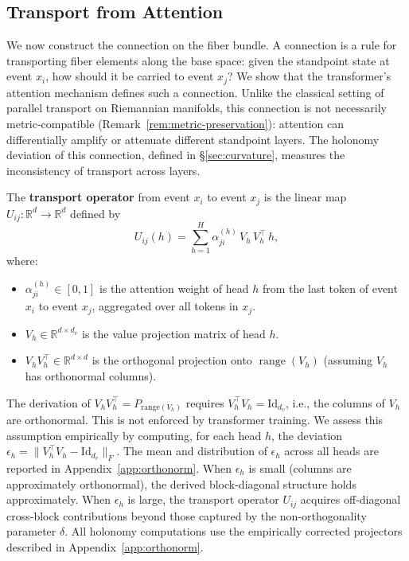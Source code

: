 \subsection{Transport from Attention}
\label{sec:transport}

We now construct the connection on the fiber bundle. A connection is a rule for
transporting fiber elements along the base space: given the standpoint state at event
$x_i$, how should it be carried to event $x_j$? We show that the transformer's attention
mechanism defines such a connection. Unlike the classical setting of parallel transport on
Riemannian manifolds, this connection is not necessarily metric-compatible
(Remark~\ref{rem:metric-preservation}): attention can differentially amplify or attenuate
different standpoint layers. The holonomy deviation of this connection, defined in
\S\ref{sec:curvature}, measures the inconsistency of transport across layers.

\begin{definition}
\label{def:transport-operator}
The \textbf{transport operator} from event $x_i$ to event $x_j$ is the linear map
$U_{ij} : \mathbb{R}^d \to \mathbb{R}^d$ defined by
\[
    U_{ij}(h) = \sum_{h=1}^{H} \alpha_{ji}^{(h)}\, V_h\, V_h^\top\, h,
\]
where:
\begin{itemize}
    \item $\alpha_{ji}^{(h)} \in [0,1]$ is the attention weight of head $h$ from the
    last token of event $x_i$ to event $x_j$, aggregated over all tokens in $x_j$.
    \item $V_h \in \mathbb{R}^{d \times d_v}$ is the value projection matrix of head $h$.
    \item $V_h V_h^\top \in \mathbb{R}^{d \times d}$ is the orthogonal projection onto
    $\operatorname{range}(V_h)$ (assuming $V_h$ has orthonormal columns).
\end{itemize}
\end{definition}

\begin{remark}
\label{rem:orthonormality}
The derivation of $V_h V_h^\top = P_{\mathrm{range}(V_h)}$ requires $V_h^\top V_h =
\mathrm{Id}_{d_v}$, i.e., the columns of $V_h$ are orthonormal. This is not enforced by
transformer training. We assess this assumption empirically by computing, for each head
$h$, the deviation $\epsilon_h = \|V_h^\top V_h - \mathrm{Id}_{d_v}\|_F$. The mean and
distribution of $\epsilon_h$ across all heads are reported in Appendix~\ref{app:orthonorm}.
When $\epsilon_h$ is small (columns are approximately orthonormal), the derived
block-diagonal structure holds approximately. When $\epsilon_h$ is large, the transport
operator $U_{ij}$ acquires off-diagonal cross-block contributions beyond those captured by
the non-orthogonality parameter $\delta$. All holonomy computations use the empirically
corrected projectors described in Appendix~\ref{app:orthonorm}.
\end{remark}

